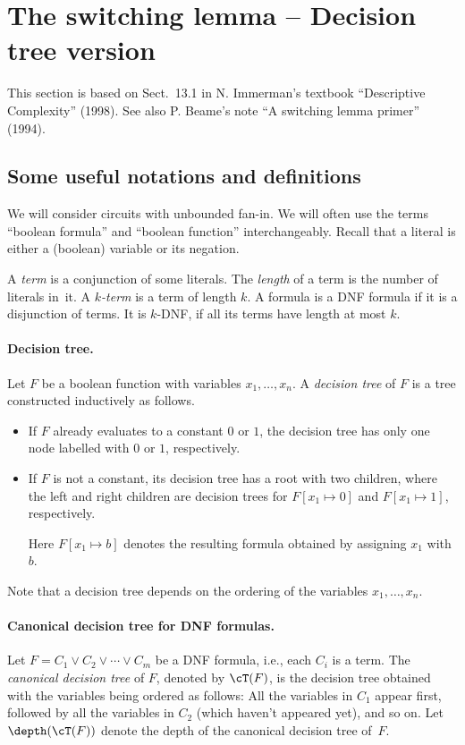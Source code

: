 \documentclass[11pt, a4paper]{article}
\begin{document}
\section{The switching lemma -- Decision tree version}


This section is based on Sect.~13.1 in N. Immerman's textbook ``Descriptive Complexity'' (1998).
See also P. Beame's note ``A switching lemma primer'' (1994).

\subsection{Some useful notations and definitions}

We will consider circuits with unbounded fan-in.
We will often use the terms ``boolean formula'' and ``boolean function'' interchangeably.
Recall that a literal is either a (boolean) variable or its negation.

A {\em term} is a conjunction of some literals.
The {\em length} of a term is the number of literals in~it.
A {\em $k$-term} is a term of length $k$.
A formula is a DNF formula if it is a disjunction of terms.
It is $k$-DNF, if all its terms have length at most $k$.


\paragraph*{Decision tree.}
Let $F$ be a boolean function with variables $x_1,\ldots,x_n$.
A {\em decision tree} of $F$ is a tree constructed inductively as follows.
\begin{itemize}
\item
If $F$ already evaluates to a constant $0$ or $1$, 
the decision tree has only one node labelled with $0$ or $1$, respectively.
\item
If $F$ is not a constant, its decision tree has a root with two children,
where the left and right children are decision trees for $F[x_1\mapsto 0]$ and $F[x_1\mapsto 1]$, respectively.

Here $F[x_1\mapsto b]$ denotes the resulting formula obtained by assigning $x_1$ with $b$.
\end{itemize}
Note that a decision tree depends on the ordering of the variables $x_1,\ldots,x_n$.

\paragraph*{Canonical decision tree for DNF formulas.}
Let $F = C_1\vee C_2 \vee \cdots \vee C_m$ be a DNF formula, i.e., each $C_i$ is a term.
The {\em canonical decision tree} of $F$, denoted by $\cT(F)$, is the decision tree
obtained with the variables being ordered as follows:
All the variables in $C_1$ appear first, followed by all the variables in $C_2$ (which haven't appeared yet),
and so on.
Let $\depth(\cT(F))$ denote the depth of the canonical decision tree of~$F$.
\end{document}
